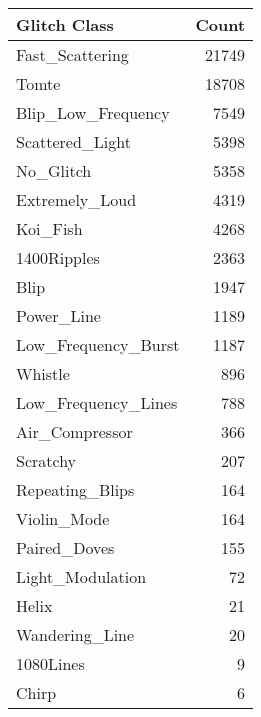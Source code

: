 \begin{tabular}{lr}
\toprule
Glitch Class & Count \\
\midrule
Fast_Scattering & 21749 \\
Tomte & 18708 \\
Blip_Low_Frequency & 7549 \\
Scattered_Light & 5398 \\
No_Glitch & 5358 \\
Extremely_Loud & 4319 \\
Koi_Fish & 4268 \\
1400Ripples & 2363 \\
Blip & 1947 \\
Power_Line & 1189 \\
Low_Frequency_Burst & 1187 \\
Whistle & 896 \\
Low_Frequency_Lines & 788 \\
Air_Compressor & 366 \\
Scratchy & 207 \\
Repeating_Blips & 164 \\
Violin_Mode & 164 \\
Paired_Doves & 155 \\
Light_Modulation & 72 \\
Helix & 21 \\
Wandering_Line & 20 \\
1080Lines & 9 \\
Chirp & 6 \\
\bottomrule
\end{tabular}
